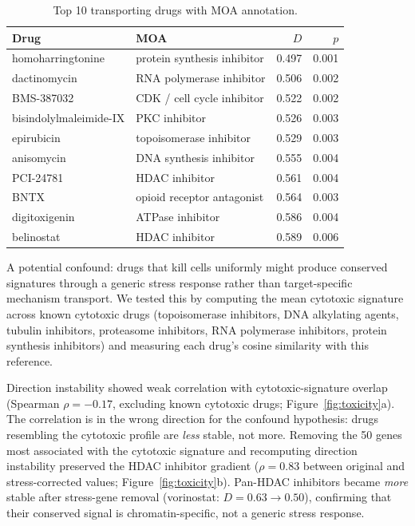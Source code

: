 \documentclass[11pt]{article}
\begin{document}
\begin{table}[t]
\centering
\caption{Top 10 transporting drugs with MOA annotation.}
\label{tab:top}
\small
\begin{tabular}{llrr}
\toprule
Drug & MOA & $D$ & $p$ \\
\midrule
homoharringtonine & protein synthesis inhibitor & 0.497 & 0.001 \\
dactinomycin & RNA polymerase inhibitor & 0.506 & 0.002 \\
BMS-387032 & CDK / cell cycle inhibitor & 0.522 & 0.002 \\
bisindolylmaleimide-IX & PKC inhibitor & 0.526 & 0.003 \\
epirubicin & topoisomerase inhibitor & 0.529 & 0.003 \\
anisomycin & DNA synthesis inhibitor & 0.555 & 0.004 \\
PCI-24781 & HDAC inhibitor & 0.561 & 0.004 \\
BNTX & opioid receptor antagonist & 0.564 & 0.003 \\
digitoxigenin & ATPase inhibitor & 0.586 & 0.004 \\
belinostat & HDAC inhibitor & 0.589 & 0.006 \\
\bottomrule
\end{tabular}
\end{table}

A potential confound: drugs that kill cells uniformly might produce
conserved signatures through a generic stress response rather than
target-specific mechanism transport. We tested this by computing the
mean cytotoxic signature across known cytotoxic drugs (topoisomerase
inhibitors, DNA alkylating agents, tubulin inhibitors, proteasome
inhibitors, RNA polymerase inhibitors, protein synthesis inhibitors)
and measuring each drug's cosine similarity with this reference.

Direction instability showed weak correlation with cytotoxic-signature
overlap (Spearman $\rho = -0.17$, excluding known cytotoxic drugs;
Figure~\ref{fig:toxicity}a). The correlation is in the wrong direction
for the confound hypothesis: drugs resembling the cytotoxic profile are
\emph{less} stable, not more. Removing the 50 genes most associated with
the cytotoxic signature and recomputing direction instability preserved
the HDAC inhibitor gradient ($\rho = 0.83$ between original and
stress-corrected values; Figure~\ref{fig:toxicity}b). Pan-HDAC
inhibitors became \emph{more} stable after stress-gene removal
(vorinostat: $D = 0.63 \to 0.50$), confirming that their conserved
signal is chromatin-specific, not a generic stress response.
\end{document}

